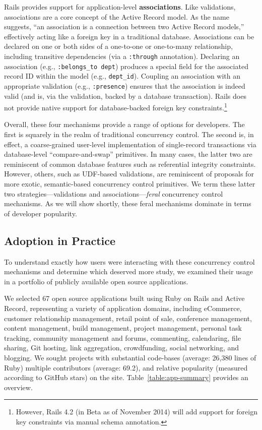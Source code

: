 \begin{myenumerate}
\item Rails provides support for application-level
  \textbf{associations}. Like validations, associations are a core
  concept of the Active Record model. As the name suggests, ``an
  association is a connection between two Active Record models,''
  effectively acting like a foreign key in a traditional
  database. Associations can be declared on one or both sides of a
  one-to-one or one-to-many relationship, including transitive
  dependencies (via a \texttt{:through} annotation). Declaring an
  association (e.g., \texttt{:belongs\_to dept}) produces a special
  field for the associated record ID within the model (e.g.,
  \texttt{dept\_id}). Coupling an association with an appropriate
  validation (e.g., \texttt{:presence}) ensures that the association
  is indeed valid (and is, via the validation, backed by a database
  transaction). Rails does not provide native support for
  database-backed foreign key constraints.\footnote{However, Rails 4.2
    (in Beta as of November 2014) will add support for foreign key
    constraints via manual schema annotation.}
\end{myenumerate}

Overall, these four mechanisms provide a range of options for
developers. The first is squarely in the realm of traditional
concurrency control. The second is, in effect, a coarse-grained
user-level implementation of single-record transactions via
database-level ``compare-and-swap'' primitives. In many cases, the
latter two are reminiscent of common database features such as
referential integrity constraints. However, others, such as UDF-based
validations, are reminiscent of proposals for more exotic,
semantic-based concurrency control primitives. We term these latter
two strategies---validations and associations---\textit{feral}
concurrency control mechanisms. As we will show shortly, these feral
mechanisms dominate in terms of developer popularity.

\subsection{Adoption in Practice}

To understand exactly how users were interacting with these
concurrency control mechanisms and determine which deserved more
study, we examined their usage in a portfolio of publicly available
open source applications.

 We selected 67 open source applications
built using Ruby on Rails and Active Record, representing a variety of
application domains, including eCommerce, customer relationship
management, retail point of sale, conference management, content
management, build management, project management, personal task
tracking, community management and forums, commenting, calendaring,
file sharing, Git hosting, link aggregation, crowdfunding, social
networking, and blogging. We sought projects with substantial
code-bases (average: 26,380 lines of Ruby) multiple contributors
(average: 69.2), and relative popularity (measured according to GitHub
stars) on the site. Table~\ref{table:app-summary} provides an
overview.


